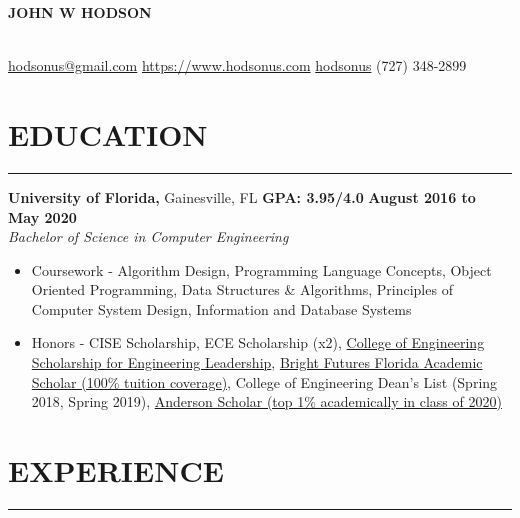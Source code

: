 \documentclass[11pt]{article} %
\begin{document}
	
	\noindent\centerline{ \huge\textbf{JOHN W HODSON}}\\
	
	\noindent \faEnvelopeSquare \space\href{mailto:hodsonus@gmail.com}{hodsonus@gmail.com} \hspace*{\fill} \faHome \space \href{https://www.hodsonus.com}{https://www.hodsonus.com} \hspace*{\fill} \faGithub \space \href{https://github.com/hodsonus}{hodsonus} \hspace*{\fill} \faMobilePhone \space (727) 348-2899\\
	
	\section*{EDUCATION}
		\hrule \relax
		\vspace{.4cm}
		
		\noindent \textbf{University of Florida,} Gainesville, FL
		\hfill\textbf{GPA: 3.95/4.0}
		\hfill\textbf{August 2016 to May 2020}\\
		\textit{Bachelor of Science in Computer Engineering}
		\begin{itemize}[noitemsep,nolistsep, label = {-}]
			\item  Coursework - 
											Algorithm Design,
											Programming Language Concepts,
											Object Oriented Programming,
											Data Structures \& Algorithms,
											Principles of Computer System Design,
											Information and Database Systems
			\item  Honors - 
											CISE Scholarship,
											ECE Scholarship (x2),
											\href{https://www.eng.ufl.edu/leadership/students/scholarships/thomas-o-hunter-leadership/}
													{College of Engineering Scholarship for Engineering Leadership},
											\href{https://www.sfa.ufl.edu/types-of-aid/bright-futures/}
													{Bright Futures Florida Academic Scholar (100\% tuition coverage)},
											College of Engineering Dean\rq s List (Spring 2018, Spring 2019),
											\href{https://sites.clas.ufl.edu/clas-main/undergraduate/anderson-scholars/anderson-scholars-listing/}
													{Anderson Scholar (top 1\% academically in class of 2020)}
		\end{itemize}
		
		\vspace{.20cm}
	
	\section*{EXPERIENCE}
		\hrule \relax
		\vspace{.4cm}
		
\end{document}

